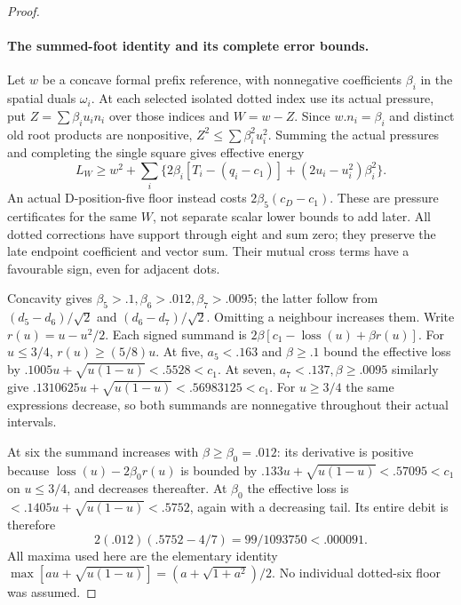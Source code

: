 \begin{proof}
\paragraph{The summed-foot identity and its complete error bounds.}
Let $w$ be a concave formal prefix reference, with nonnegative
coefficients $\beta_i$ in the spatial duals $\omega_i$.
At each selected isolated dotted index use its actual pressure,
put $Z=\sum\beta_i u_i n_i$ over those indices and $W=w-Z$.
Since $w.n_i=\beta_i$ and distinct old root products are
nonpositive, $Z^2\le\sum\beta_i^2u_i^2$. Summing the actual
pressures and completing the single square gives effective energy
\[
 L_W\ge w^2+\sum_i
 \{2\beta_i[T_i-(q_i-c_1)]+(2u_i-u_i^2)\beta_i^2\}.
\]
An actual D-position-five floor instead costs
$2\beta_5(c_D-c_1)$. These are pressure certificates for the
same $W$, not separate scalar lower bounds to add later.
All dotted corrections have support through eight and sum zero;
they preserve the late endpoint coefficient and vector sum. Their
mutual cross terms have a favourable sign, even for adjacent dots.

Concavity gives $\beta_5>.1,\beta_6>.012,\beta_7>.0095$;
the latter follow from $(d_5-d_6)/\sqrt2$ and
$(d_6-d_7)/\sqrt2$. Omitting a neighbour increases them.
Write $r(u)=u-u^2/2$. Each signed summand is
$2\beta[c_1-\operatorname{loss}(u)+\beta r(u)]$.
For $u\le3/4$, $r(u)\ge(5/8)u$. At five, $a_5<.163$ and
$\beta\ge.1$ bound the effective loss by
$.1005u+\sqrt{u(1-u)}<.5528<c_1$.
At seven, $a_7<.137,\beta\ge.0095$ similarly give
$.1310625u+\sqrt{u(1-u)}<.56983125<c_1$.
For $u\ge3/4$ the same expressions decrease, so both summands
are nonnegative throughout their actual intervals.

At six the summand increases with $\beta\ge\beta_0=.012$:
its derivative is positive because
$\operatorname{loss}(u)-2\beta_0r(u)$ is bounded by
$.133u+\sqrt{u(1-u)}<.57095<c_1$ on $u\le3/4$,
and decreases thereafter. At $\beta_0$ the effective loss is
$<.1405u+\sqrt{u(1-u)}<.5752$, again with a decreasing tail.
Its entire debit is therefore
\[
 2(.012)(.5752-4/7)=99/1093750<.000091.
\]
All maxima used here are the elementary identity
$\max[au+\sqrt{u(1-u)}]=(a+\sqrt{1+a^2})/2$.
No individual dotted-six floor was assumed.


\end{proof}
